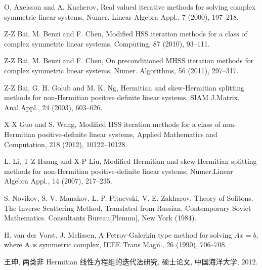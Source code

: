 \documentclass[UTF8]{ctexart}
\theoremstyle{plain}
\theoremstyle{nonumberplain}
\numberwithin{equation}{section} %
\begin{document}
\begin{thebibliography}{99}

O. Axelsson and A. Kucherov,
Real valued iterative methods for solving complex symmetric linear systems,
Numer. Linear Algebra Appl., 7 (2000), 197--218.


Z-Z Bai, M. Benzi and F. Chen,
Modified HSS iteration methods for a class of complex symmetric linear systems,
Computing, 87 (2010), 93--111.

Z-Z Bai, M. Benzi and F. Chen,
On preconditioned MHSS iteration methods for complex symmetric linear systems,
Numer. Algorithms, 56 (2011), 297--317.

Z-Z Bai, G. H. Golub and M. K. Ng,
Hermitian and skew-Hermitian splitting methods for non-Hermitian positive definite linear systems,
SIAM J.Matrix. Anal.Appl., 24 (2003), 603--626.

X-X Guo and S. Wang,
Modified HSS iteration methods for a class of non-Hermitian
positive-definite linear systems,
Applied Mathematics and Computation, 218 (2012), 10122--10128.

L. Li, T-Z Huang and X-P Liu,
Modified Hermitian and skew-Hermitian splitting methods for non-Hermitian positive-definite linear systems,
Numer.Linear Algebra Appl., 14 (2007), 217--235.

S. Novikov, S. V. Manakov, L. P. Pitaevski, V. E. Zakharov,
Theory of Solitons. The Inverse Scattering Method,
Translated from Russian. Contemporary Soviet Mathematics. Consultants Bureau[Plenum], New York (1984).

H. van der Vorst, J. Melissen,
A Petrov-Galerkin type method for solving $Ax=b$, where A is symmetric complex,
IEEE Trans Magn., 26 (1990), 706--708.

王珅,
两类非 Hermitian 线性方程组的迭代法研究, 硕士论文, 中国海洋大学, 2012.

\end{thebibliography}
\end{document}

